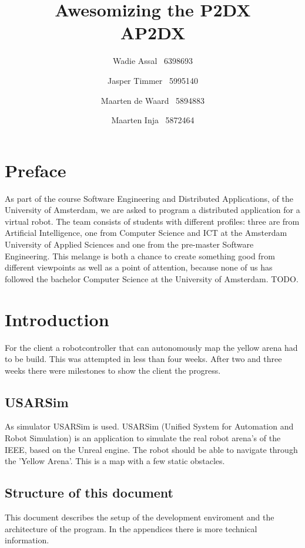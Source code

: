 \documentclass[a4paper,10pt]{article}
\title{Awesomizing the P2DX\\\small AP2DX}
\author{Wadie Assal \ 6398693 \and Jasper Timmer \ 5995140 \and Maarten de Waard \ 5894883 \and  Maarten Inja \ 5872464}
\begin{document}
\maketitle
\newpage
\tableofcontents
\newpage


\section{Preface}
As part of the course Software Engineering and Distributed Applications, of the University of Amsterdam, we are asked to program a distributed application for a virtual robot. The team consists of students with different profiles: three are from Artificial Intelligence, one from Computer Science and ICT at the Amsterdam University of Applied Sciences and one from the pre-master Software Engineering. This melange is both a chance to create something good from different viewpoints as well as a point of attention, because none of us has followed the bachelor Computer Science at the University of Amsterdam. TODO.

\newpage

\section{Introduction}
For the client a robotcontroller that can autonomously map the yellow arena had to be build. This was attempted in less than four weeks. After two and three weeks there were milestones to show the client the progress.

\subsection{USARSim}
As simulator USARSim is used. USARSim (Unified System for Automation and Robot Simulation) is an application to simulate the real robot arena's of the IEEE, based on the Unreal engine. The robot should be able to navigate through the 'Yellow Arena'. This is a map with a few static obstacles.

\subsection{Structure of this document}
This document describes the setup of the development enviroment and the architecture of the program. In the appendices there is more technical information.
\end{document}
